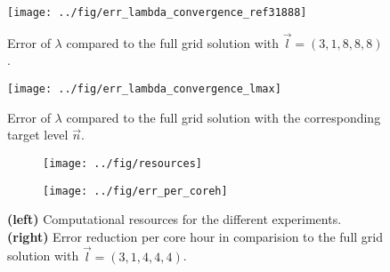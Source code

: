 \documentclass{scrartcl}
\begin{document}
\begin{figure}[ht]
	\centering
	\texttt{[image: ../fig/err\_lambda\_convergence\_ref31888]}
	\caption{Error of $\lambda$ compared to the full grid solution with $\vec{l} = (3,1,8,8,8)$. }
	\label{fig:err_lambda_convergence_ref31888}
\end{figure}

\begin{figure}[h]
	\centering
	\texttt{[image: ../fig/err\_lambda\_convergence\_lmax]}
	\caption{Error of $\lambda$ compared to the full grid solution with the corresponding target level $\vec{n}$. }
	\label{fig:err_lambda_convergence_lmax}
\end{figure}

\begin{figure}[h]
    \begin{subfigure}{0.5\textwidth}
        \texttt{[image: ../fig/resources]}
    \end{subfigure}%
    \begin{subfigure}{0.5\textwidth}
        \texttt{[image: ../fig/err\_per\_coreh]}
    \end{subfigure}%
    \caption{\textbf{(left)} Computational resources for the different experiments. \textbf{(right)} Error reduction per core hour in comparision to the full grid solution with $\vec{l} = (3,1,4,4,4)$. }
    \label{fig:resources}
\end{figure}
\end{document}
